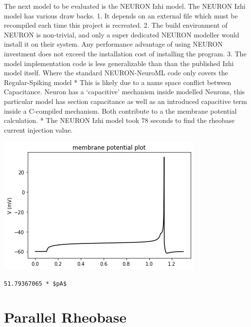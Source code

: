 The next model to be evaluated is the NEURON Izhi model. The NEURON Izhi model has various draw backs. 1. It depends on an external file which must be recompiled each time this project is recreated. 2. The build environment of NEURON is non-trivial, and only a super dedicated NEURON modeller would install it on their system. Any performance advantage of using NEURON investment does not exceed the installation cost of installing the program. 3. The model implementation code is less generalizable than than the published Izhi model itself. Where the standard NEURON-NeuroML code only covers the Regular-Spiking model * This is likely due to a name space conflict between Capacitance. Neuron has a `capacitive' mechanism inside modelled Neurons, this particular model has section capacitance as well as an introduced capacitive term inside a C-compiled mechanism. Both contribute to a the membrane
potential calculation. * The NEURON Izhi model took $78$ seconds to find the rheobase current injection value.
    
\begin{center}
    \includegraphics{figures/backend_check_files/backend_check_14_2.png}
\end{center}


\begin{verbatim}
51.79367065 * $pA$
\end{verbatim}
        


\section{Parallel Rheobase}


